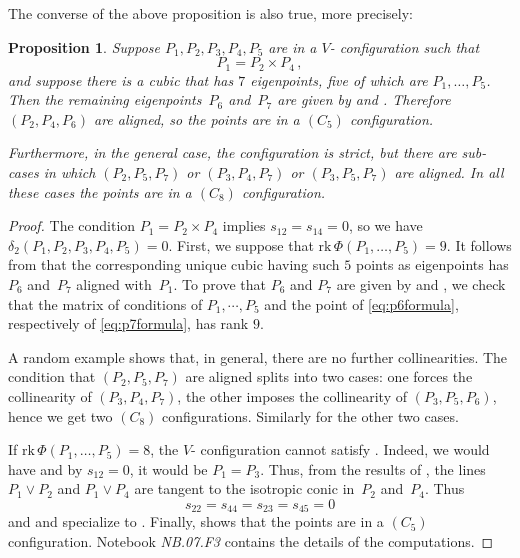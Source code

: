 \documentclass[a4paper, 11pt, reqno]{amsart}
\theoremstyle{plain}
\newtheorem{prop}[lemma]{Proposition}
\theoremstyle{definition}
\newcommand{\nb}[2]{\textsl{{NB}.{#1}.{#2}}}
\newcommand{\rk}{\ensuremath{\mathrm{rk}}}
\begin{document}
%
The converse of the above proposition is also true, more precisely:
\begin{prop}
   Suppose $P_1, P_2, P_3, P_4, P_5$ are in a $V$- configuration such that
%
\[
  P_1 = P_2 \times P_4 \,,
\]
%
and suppose there is a cubic that has $7$ eigenpoints, five of which are $P_1, \dotsc, P_5$. Then the remaining eigenpoints~$P_6$ and~$P_7$ are given by  and . Therefore $(P_2, P_4, P_6)$ are aligned, so the points are in a $(C_5)$ configuration.

Furthermore, in the general case, the configuration is
strict, but
there are sub-cases in which $(P_2, P_5, P_7)$ or $(P_3, P_4, P_7)$ or $(P_3, P_5, P_7)$ are aligned. In all these cases the points are in a $(C_8)$ configuration.
\end{prop}
%
\begin{proof}
The condition $P_1 = P_2 \times P_4$ implies $s_{12}=s_{14}=0$,
so we have $\delta_2 (P_1,P_2,P_3,P_4,P_5)=0$.
First, we suppose that $\rk \, \Phi(P_1, \dotsc, P_5) = 9$.
It follows from  that the corresponding unique cubic having such $5$ points as eigenpoints has $P_6$ and~$P_7$ aligned with~$P_1$.
To prove that $P_6$ and $P_7$ are given by  and ,
we check that the matrix of conditions of $P_1,\cdots, P_5$ and the point of
\eqref{eq:p6formula}, respectively of \eqref{eq:p7formula}, has rank $9$.

A random example shows that, in general, there are no further collinearities.
The condition that $(P_2, P_5, P_7)$ are aligned splits into two cases:
one forces the collinearity of $(P_3, P_4, P_7)$, the other imposes the collinearity of $(P_3, P_5, P_6)$,
hence we get two $(C_8)$ configurations. Similarly for the other two cases.

If $\rk \, \Phi(P_1, \dotsc, P_5) = 8$, the $V$- configuration cannot satisfy . Indeed, we would have  and by $s_{12} = 0$, it would be $P_1 = P_3$. Thus,
from the results of , the lines $P_1 \vee P_2$ and $P_1 \vee P_4$ are tangent to the isotropic conic in~$P_2$ and~$P_4$. Thus
\[
s_{22}= s_{44}= s_{23}= s_{45}=0
\]
and  and  specialize to . Finally,  shows that the points are in a $(C_5)$ configuration. Notebook \nb{07}{F3} contains the details of the computations.
\end{proof}
%
\end{document}
